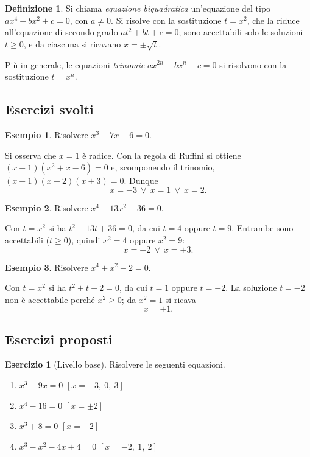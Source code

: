 \documentclass[12pt,a4paper,openany]{book}
\theoremstyle{definition}
\newtheorem{definizione}{Definizione}[section]
\newtheorem{esempio}{Esempio}[section]
\newtheorem{esercizio}{Esercizio}[section]
\theoremstyle{plain}
\theoremstyle{remark}
\begin{document}
\begin{definizione}
Si chiama \emph{equazione biquadratica} un'equazione del tipo $ax^4+bx^2+c=0$, con $a\neq 0$. Si risolve con la sostituzione $t=x^2$, che la riduce all'equazione di secondo grado $at^2+bt+c=0$; sono accettabili solo le soluzioni $t\ge 0$, e da ciascuna si ricavano $x=\pm\sqrt{t}$.
\end{definizione}

Più in generale, le equazioni \emph{trinomie} $ax^{2n}+bx^n+c=0$ si risolvono con la sostituzione $t=x^n$.

\subsection*{Esercizi svolti}

\begin{esempio}
Risolvere $x^3-7x+6=0$.

Si osserva che $x=1$ è radice. Con la regola di Ruffini si ottiene $(x-1)(x^2+x-6)=0$ e, scomponendo il trinomio, $(x-1)(x-2)(x+3)=0$. Dunque
\[
x=-3\ \lor\ x=1\ \lor\ x=2.
\]
\end{esempio}

\begin{esempio}
Risolvere $x^4-13x^2+36=0$.

Con $t=x^2$ si ha $t^2-13t+36=0$, da cui $t=4$ oppure $t=9$. Entrambe sono accettabili ($t\ge 0$), quindi $x^2=4$ oppure $x^2=9$:
\[
x=\pm 2\ \lor\ x=\pm 3.
\]
\end{esempio}

\begin{esempio}
Risolvere $x^4+x^2-2=0$.

Con $t=x^2$ si ha $t^2+t-2=0$, da cui $t=1$ oppure $t=-2$. La soluzione $t=-2$ non è accettabile perché $x^2\ge 0$; da $x^2=1$ si ricava
\[
x=\pm 1.
\]
\end{esempio}

\subsection*{Esercizi proposti}

\begin{esercizio}[Livello base]
Risolvere le seguenti equazioni.
\begin{enumerate}[label=\alph*)]
\item $x^3-9x=0$ \hfill $[x=-3,\ 0,\ 3]$
\item $x^4-16=0$ \hfill $[x=\pm 2]$
\item $x^3+8=0$ \hfill $[x=-2]$
\item $x^3-x^2-4x+4=0$ \hfill $[x=-2,\ 1,\ 2]$
\end{enumerate}
\end{esercizio}
\end{document}
